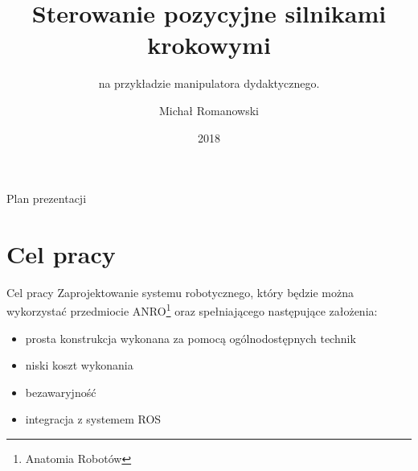 \documentclass{beamer}
\title[Sterowanie pozycyjne silnikami krokowymi.]{Sterowanie pozycyjne silnikami krokowymi}
\subtitle{na przykładzie manipulatora dydaktycznego.}
\author{Michał Romanowski}
\date{2018}
\begin{document}
\begin{frame}
  \titlepage
\end{frame}

\begin{frame}{Plan prezentacji}
  \tableofcontents
\end{frame}


\section{Cel pracy}
\begin{frame}{Cel pracy}
	Zaprojektowanie systemu robotycznego, który będzie można wykorzystać przedmiocie ANRO\footnote{Anatomia Robotów}  oraz spełniającego następujące założenia:
	\\
	\begin{itemize}
		\item {
			prosta konstrukcja wykonana za pomocą ogólnodostępnych technik
		}
		\item{
			niski koszt wykonania		
		}
		
		\item{
			bezawaryjność	
		}
		
		\item{
			integracja z systemem ROS	
		}
		
	\end{itemize}
\end{frame}
\end{document}
